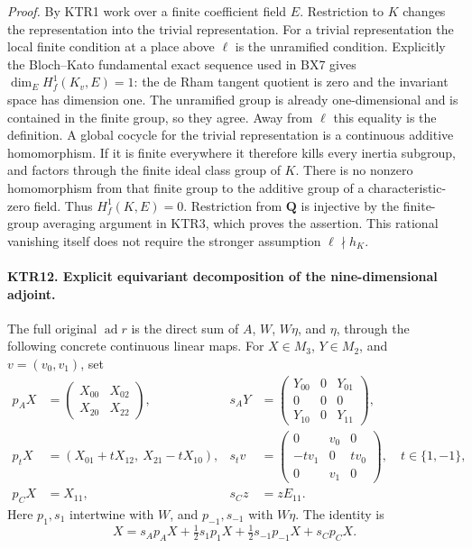 \documentclass[11pt,a4paper]{article}
\numberwithin{equation}{section}
\theoremstyle{remark}\newtheorem{remark}[theorem]{Remark}
\begin{document}
\emph{Proof.}
By KTR1 work over a finite coefficient field \(E\).
Restriction to \(K\) changes the representation into the
trivial representation.  For a trivial representation the local
finite condition at a place above \(\ell\) is the unramified
condition.  Explicitly the Bloch--Kato fundamental exact sequence
used in BX7 gives \(\dim_E H^1_f(K_v,E)=1\): the de Rham
tangent quotient is zero and the invariant space has dimension
one.  The unramified group is already one-dimensional and is
contained in the finite group, so they agree.  Away from
\(\ell\) this equality is the definition.  A global cocycle
for the trivial representation is a continuous additive
homomorphism.  If it is finite everywhere it therefore kills
every inertia subgroup, and factors through the finite ideal
class group of \(K\).  There is no nonzero homomorphism from
that finite group to the additive group of a characteristic-zero
field.  Thus \(H^1_f(K,E)=0\).  Restriction from \(\mathbf Q\)
is injective by the finite-group averaging argument in KTR3,
which proves the assertion.  This rational vanishing itself
does not require the stronger assumption \(\ell\nmid h_K\).

\paragraph{KTR12. Explicit equivariant decomposition of the nine-dimensional adjoint.}
\label{claim:KTR12}
The full original \(\operatorname{ad}r\) is the direct sum
of \(A\), \(W\), \(W\eta\), and \(\eta\), through
the following concrete continuous linear maps.  For
\(X\in M_3\), \(Y\in M_2\), and \(v=(v_0,v_1)\), set
\[
 \begin{aligned}
 p_A X&=\begin{pmatrix}X_{00}&X_{02}\\X_{20}&X_{22}\end{pmatrix},
 &s_A Y&=\begin{pmatrix}Y_{00}&0&Y_{01}\\0&0&0\\Y_{10}&0&Y_{11}\end{pmatrix},\\
 p_tX&=(X_{01}+tX_{12},\ X_{21}-tX_{10}),
 &s_tv&=\begin{pmatrix}0&v_0&0\\-t v_1&0&t v_0\\0&v_1&0\end{pmatrix},
 \quad t\in\{1,-1\},\\
 p_CX&=X_{11},&s_Cz&=zE_{11}.
 \end{aligned}
 \tag{KTR.18}
\]
Here \(p_1,s_1\) intertwine with \(W\), and
\(p_{-1},s_{-1}\) with \(W\eta\).  The identity is
\[
       X=s_Ap_AX+\tfrac12s_1p_1X+
                       \tfrac12s_{-1}p_{-1}X+s_Cp_CX.
 \tag{KTR.19}
\]
\end{document}
